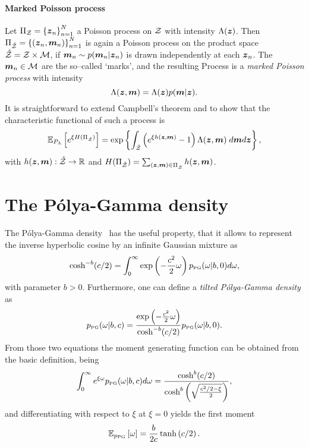 \paragraph{Marked Poisson process} Let $\Pi_{\mathcal{Z}}=\left\lbrace \boldsymbol{z}_n \right\rbrace_{n=1}^N$ a Poisson process on $\mathcal{Z}$ with intensity  $\Lambda(\boldsymbol{z})$. Then $\Pi_{\hat{\mathcal{Z}}}=\left\lbrace (\boldsymbol{z}_n,\boldsymbol{m}_{n}) \right\rbrace_{n=1}^N$ is again a Poisson process on the product space $\hat{\mathcal{Z}} = \mathcal{Z}\times\mathcal{M}$, if $\boldsymbol{m}_n\sim p(\boldsymbol{m}_n\vert \boldsymbol{z}_n)$ is drawn independently at each $\boldsymbol{z}_n$. The $\boldsymbol{m}_n\in \mathcal{M}$ are the so--called `marks', and the resulting Process is a {\it marked Poisson process} with intensity
\begin{equation}
\Lambda(\boldsymbol{z},\boldsymbol{m}) = \Lambda(\boldsymbol{z})p(\boldsymbol{m}\vert \boldsymbol{z}).
\end{equation}
It is straightforward to extend Campbell's theorem and to show that the characteristic functional of such a process is 
\begin{equation}\label{eq:marked characteristic functional}
\mathbb{E}_{P_{\Lambda}}\left[ e^{\xi H(\Pi_{\hat{\mathcal{Z}}})} \right] = \exp\left\{\int_{\hat{\mathcal{Z}}} \left(e^{\xi h(\boldsymbol{z},\boldsymbol{m})} - 1\right)\Lambda(\boldsymbol{z},\boldsymbol{m})\;d\boldsymbol{m}d\boldsymbol{z} \right\},
\end{equation}
with $h(\boldsymbol{z},\boldsymbol{m}):\hat{\mathcal{Z}}\rightarrow\mathbb{R}$ and $H(\Pi_{\hat{\mathcal{Z}}})=\sum_{(\boldsymbol{z},\boldsymbol{m})\in \Pi_{\hat{\mathcal{Z}}}}h(\boldsymbol{z},\boldsymbol{m})$.

\section{The P\'olya-Gamma density}\label{app:polya gamma}
The P\'olya-Gamma density~\citep{polson2013bayesian} has the useful property, that it allows to represent the inverse hyperbolic cosine by an infinite Gaussian mixture as
\begin{equation}
\cosh^{-b}(c/2) = \int_{0}^\infty \exp\left(-\frac{c^2}{2}\omega\right)p_{\scriptscriptstyle \mathrm{PG}}(\omega\vert b,0)d\omega,
\end{equation}
with parameter $b>0$. Furthermore, one can define a {\it tilted P\'olya-Gamma density} as 
\begin{equation}
p_{\scriptscriptstyle \mathrm{PG}}(\omega\vert b, c)= \frac{\exp\left(-\frac{c^2}{2}\omega\right)}{\cosh^{-b}(c/2)}p_{\scriptscriptstyle \mathrm{PG}}(\omega\vert b,0).
\end{equation}
From those two equations the moment generating function can be obtained from the basic definition, being
\begin{equation}
\int_{0}^\infty e^{\xi\omega}p_{\scriptscriptstyle \mathrm{PG}}(\omega\vert b,c)d\omega = \frac{\cosh^b(c/2)}{\cosh^b\left(\sqrt{\frac{c^2/2-\xi}{2}}\right)},
\end{equation}
and differentiating with respect to $\xi$ at $\xi=0$ yields the first moment
\begin{equation}
\mathbb{E}_{p_{\scriptscriptstyle \mathrm{PG}}}\left[ \omega \right] = \frac{b}{2c}\tanh\left(c/2\right).
\end{equation}

